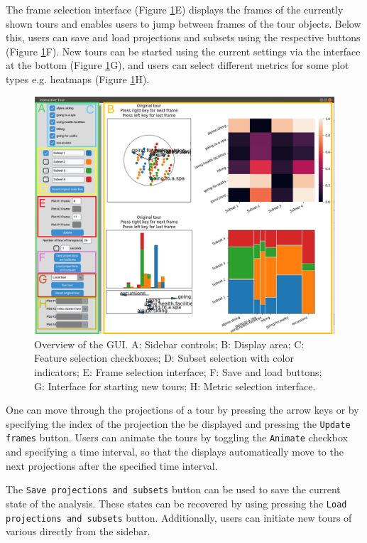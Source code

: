 \documentclass[article]{ajs}
\begin{document}
The frame selection interface (Figure \ref{fig:GUI_overview}E) displays the frames of the currently shown tours and enables users to jump between frames of the tour objects. Below this, users can save and load projections and subsets using the respective buttons (Figure \ref{fig:GUI_overview}F). New tours can be started using the current settings via the interface at the bottom (Figure \ref{fig:GUI_overview}G), and users can select different metrics for some plot types e.g. heatmaps (Figure \ref{fig:GUI_overview}H).

\begin{figure}[h!]
    \centering
    \includegraphics[width=1\textwidth]{GUI_overview.png}
    \caption{Overview of the GUI. A: Sidebar controls; B: Display area;  C: Feature selection checkboxes; D: Subset selection with color indicators; E: Frame selection interface; F: Save and load buttons; G: Interface for starting new tours; H: Metric selection interface.}
    \label{fig:GUI_overview}
\end{figure}


One can move through the projections of a tour by pressing the arrow keys or by specifying the index of the projection the be displayed and pressing the \texttt{Update frames} button. Users can animate the tours by toggling the \texttt{Animate} checkbox and specifying a time interval, so that the displays automatically move to the next projections after the specified time interval.

The \texttt{Save projections and subsets} button can be used to save the current state of the analysis. These states can be recovered by using pressing the \texttt{Load projections and subsets} button. Additionally, users can initiate new tours of various directly from the sidebar.
\end{document}

